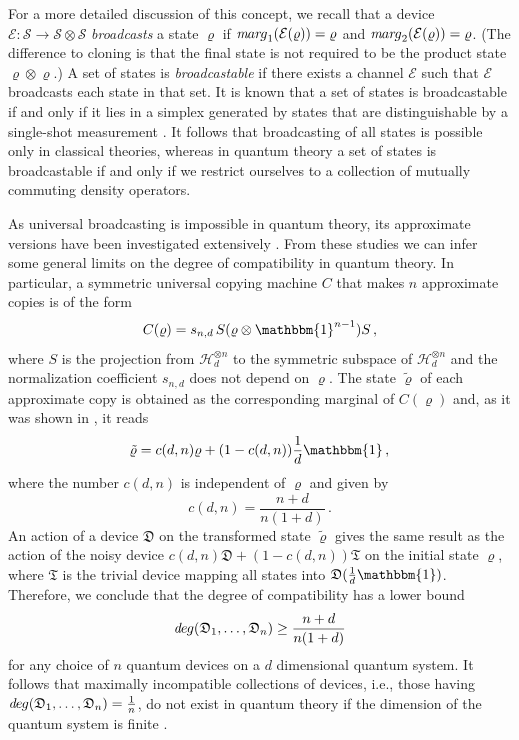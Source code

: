 \documentclass[12pt]{article}
\theoremstyle{definition}
\newcommand{\hi}{\mathcal{H}} %
\newcommand{\id}{\mathbbm{1}} %
\newcommand{\Ec}{\mathcal{E}} %
\newcommand{\Dev}{\mathfrak{D}} %
\newcommand{\Triv}{\mathfrak{T}} %
\def\marg{{\textit mar\kern-1pt g}}
\def\deg{\textit de\kern-.5pt g}
\begin{document}
For a more detailed discussion of this concept, we recall that a device $\Ec:\mathcal{S}\to\mathcal{S}\otimes\mathcal{S}$ \emph{broadcasts} a state $\varrho$ if $\marg_1 (\Ec(\varrho)) = \varrho$ and $\marg_2(\Ec(\varrho)) = \varrho$.
(The difference to cloning is that the final state is not required to be the product state $\varrho\otimes\varrho$.)
A set of states is \emph{broadcastable} if there exists a channel $\Ec$ such that $\Ec$ broadcasts each state in that set.
It is known that a set of states is broadcastable if and only if it lies in a simplex generated by states that are distinguishable by a single-shot measurement \cite{BaBaLeWi07}.
It follows that broadcasting of all states is possible only in classical theories, whereas in quantum theory a set of states is broadcastable if and only if we restrict ourselves to a collection of mutually commuting density operators.

As universal broadcasting is impossible in quantum theory, its approximate versions have been investigated extensively \cite{ScIbGiAc05}.
From these studies we can infer some general limits on the degree of compatibility in quantum theory. 
In particular, a symmetric universal copying machine $C$ that makes $n$ approximate copies is of the form \cite{KeWe99}
\begin{equation}
C(\varrho) = s_{n,d} \, S(\varrho \otimes \id^{n-1}) S\, , 
\end{equation}
where $S$ is the projection from $\hi_d^{\otimes n}$ to the symmetric subspace of $\hi_d^{\otimes n}$ and the normalization coefficient $s_{n,d}$ does not depend on $\varrho$.
The state $\tilde{\varrho}$ of each approximate copy is obtained as the corresponding marginal of $C(\varrho)$ and, as it was shown in \cite{Werner98}, it reads
\begin{equation}
\tilde{\varrho} = c(d,n) \varrho + (1-c(d,n)) \frac{1}{d} \id \, ,
\end{equation}
where the number $c(d,n)$ is independent of $\varrho$ and given by
\begin{equation}
c(d,n) = \frac{n+d}{n(1+d)} \, .
\end{equation} 
An action of a device $\Dev$ on the transformed state $\tilde{\varrho}$ gives the same result as the action of the noisy device $c(d,n) \Dev + (1-c(d,n)) \Triv$ on the initial state $\varrho$, where $\Triv$ is the trivial device mapping all states into $\Dev(\frac{1}{d} \id)$.
Therefore, we conclude that the degree of compatibility has a lower bound
\begin{equation}\label{eq:bc-bound}
\deg(\Dev_1,\ldots,\Dev_n) \geq \frac{n+d}{n(1+d)}
\end{equation}
for any choice of $n$ quantum devices on a $d$ dimensional quantum system.
It follows that maximally incompatible collections of devices, i.e., those having $\deg(\Dev_1,\ldots,\Dev_n) = \frac{1}{n}$, do not exist in quantum theory if the dimension of the quantum system is finite \cite{HeScToZi14}.
\end{document}
